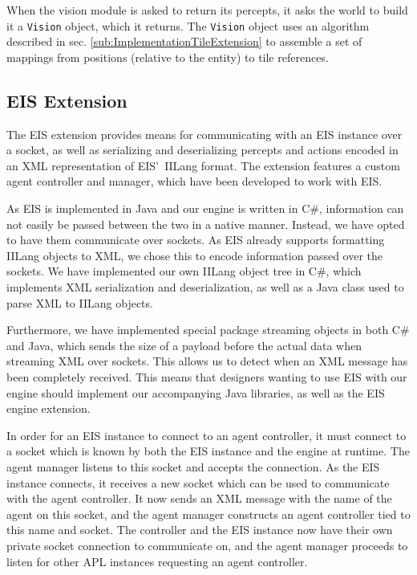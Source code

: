 When the vision module is asked to return its percepts, it asks the
world to build it a \texttt{Vision} object, which it returns. The
\texttt{Vision} object uses an algorithm described in sec. \ref{sub:ImplementationTileExtension}
to assemble a set of mappings from positions (relative to the entity)
to tile references. 


\subsection{EIS Extension\label{sub:EIS-Extension}}

The EIS extension provides means for communicating with an EIS instance
over a socket, as well as serializing and deserializing percepts and
actions encoded in an XML representation of EIS'\texttt{ }IILang format.
The extension features a custom agent controller and manager, which
have been developed to work with EIS. 

As EIS is implemented in Java and our engine is written in C\#, information
can not easily be passed between the two in a native manner. Instead,
we have opted to have them communicate over sockets. As EIS already
supports formatting IILang objects to XML, we chose this to encode
information passed over the sockets. We have implemented our own IILang
object tree in C\#, which implements XML serialization and deserialization,
as well as a Java class used to parse XML to IILang objects. 

Furthermore, we have implemented special package streaming objects
in both C\# and Java, which sends the size of a payload before the
actual data when streaming XML over sockets. This allows us to detect
when an XML message has been completely received. This means that
designers wanting to use EIS with our engine should implement our
accompanying Java libraries, as well as the EIS engine extension.

In order for an EIS instance to connect to an agent controller, it
must connect to a socket which is known by both the EIS instance and
the engine at runtime. The agent manager listens to this socket and
accepts the connection. As the EIS instance connects, it receives
a new socket which can be used to communicate with the agent controller.
It now sends an XML message with the name of the agent on this socket,
and the agent manager constructs an agent controller tied to this
name and socket. The controller and the EIS instance now have their
own private socket connection to communicate on, and the agent manager
proceeds to listen for other APL instances requesting an agent controller.


